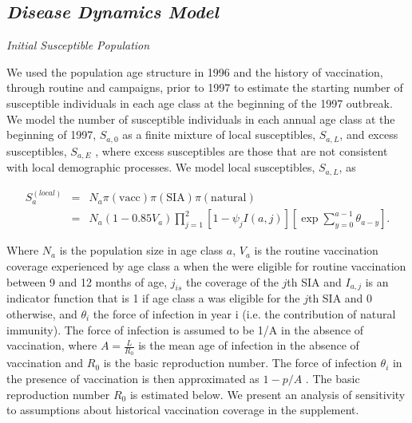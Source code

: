 \subsection{\texorpdfstring{\emph{Disease Dynamics
Model}}{Disease Dynamics Model}}\label{disease-dynamics-model}

\emph{Initial Susceptible Population}

We used the population age structure in 1996 and the history of vaccination, through routine and campaigns, prior to 1997 to estimate the starting number of susceptible individuals in each age class at the beginning of the 1997 outbreak.  We model the number of susceptible individuals in each annual age class at the beginning of 1997, \(S_{a,0}\) as a finite mixture of local susceptibles, \(S_{a,L}\), and excess susceptibles, \(S_{a,E}\) , where excess susceptibles are those that are not consistent with local demographic processes.  We model local susceptibles, \(S_{a,L}\), as 

\begin{eqnarray}
S_a^{(local)} &=& N_a \pi(\text{vacc}) \pi(\text{SIA}) \pi(\text{natural}) \\
&=& N_a (1- 0.85 V_a) \prod_{j=1}^2 \left[1- \psi_j I(a,j) \right] \left[\exp \sum_{y=0}^{a-1} \theta_{a-y} \right].
\end{eqnarray}

Where \(N_a\) is the population size in age class \(a\), \(V_a\) is the routine vaccination coverage experienced by age class a when the were eligible for routine vaccination between 9 and 12 months of age, \(j_{is}\) the coverage of the \(j\)th SIA and \(I_{a,j}\) is an indicator function that is 1 if age class a was eligible for the \(j\)th SIA and 0 otherwise, and \(\theta_i\) the force of infection in year i (i.e. the contribution of natural immunity).  The force of infection is assumed to be 1/A in the absence of vaccination, where \(A=\frac{L}{R_0}\) \cite{Anderson_1981} is the mean age of infection in the absence of vaccination and \(R_0\) is the basic reproduction number. The force of infection \(\theta_i\) in the presence of vaccination is then approximated as \(1-p/A\) \cite{Anderson_1981}.  The basic reproduction number \(R_0\) is estimated below.  We present an analysis of sensitivity to assumptions about historical vaccination coverage in the supplement.

